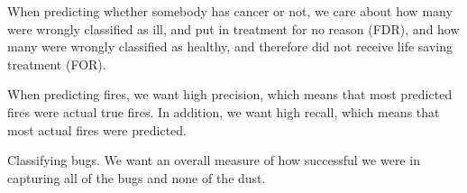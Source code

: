 \documentclass[12pt]{article}
\begin{document}
\begin{enumerate}
When predicting whether somebody has cancer or not, we care about how many were wrongly classified as ill, and put in treatment for no reason (FDR), and how many were wrongly classified as healthy, and therefore did not receive life saving treatment (FOR). 


When predicting fires, we want high precision, which means that most predicted fires were actual true fires. In addition, we want high recall, which means that most actual fires were predicted. 


Classifying bugs. We want an overall measure of how successful we were in capturing all of the bugs and none of the dust. 

\end{enumerate}
\end{document}
